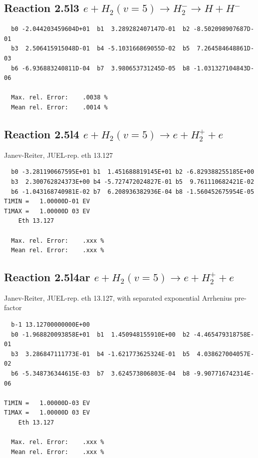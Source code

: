 \documentclass[12pt,dvipdfmx]{article}
\begin{document}
\newpage

\subsection{
Reaction 2.5l3
 $ e + H_2(v=5) \rightarrow H_2^- \rightarrow H + H^-$
}


\begin{small}\begin{verbatim}
  b0 -2.044203459604D+01  b1  3.289282407147D-01  b2 -8.502098907687D-01
  b3  2.506415915048D-01  b4 -5.103166869055D-02  b5  7.264584648861D-03
  b6 -6.936883240811D-04  b7  3.980653731245D-05  b8 -1.031327104843D-06

  Max. rel. Error:    .0038 %
  Mean rel. Error:    .0014 %

\end{verbatim}\end{small}

\subsection{
Reaction 2.5l4
 $ e + H_2(v=5) \rightarrow e + H_2^+  + e $
}
Janev-Reiter, JUEL-rep. eth 13.127

\begin{small}\begin{verbatim}
  b0 -3.281190667595E+01 b1  1.451688819145E+01 b2 -6.829388255185E+00
  b3  2.300762824373E+00 b4 -5.727472024827E-01 b5  9.761110682421E-02
  b6 -1.043168740981E-02 b7  6.208936382936E-04 b8 -1.560452675954E-05
T1MIN =   1.00000D-01 EV
T1MAX =   1.00000D 03 EV
    Eth 13.127

  Max. rel. Error:    .xxx %
  Mean rel. Error:    .xxx %
\end{verbatim}\end{small}

\subsection{
Reaction 2.5l4ar
 $ e + H_2(v=5) \rightarrow e + H_2^+  + e $
}
Janev-Reiter, JUEL-rep. eth 13.127,
with separated exponential Arrhenius pre-factor

\begin{small}\begin{verbatim}
  b-1 13.12700000000E+00
  b0 -1.968820093858E+01  b1  1.450948155910E+00  b2 -4.465479318758E-01
  b3  3.286847111773E-01  b4 -1.621773625324E-01  b5  4.038627004057E-02
  b6 -5.348736344615E-03  b7  3.624573806803E-04  b8 -9.907716742314E-06

T1MIN =   1.00000D-03 EV
T1MAX =   1.00000D 03 EV
    Eth 13.127

  Max. rel. Error:    .xxx %
  Mean rel. Error:    .xxx %
\end{verbatim}\end{small}
\end{document}
